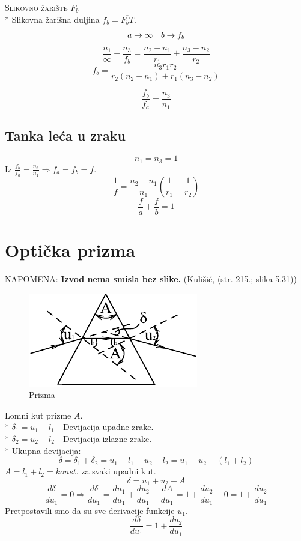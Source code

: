 \documentclass{report}
\begin{document}
\noindent \textsc{Slikovno žarište} $F_b$\\*
Slikovna žarišna duljina $f_b = \overline{F_b T}$.
$$\begin{array}{*{20}c}
   {a \to \infty } & {b \to f_b }  \\

\end{array} $$
$$\frac{n_1}{\infty} + \frac{n_3}{f_b} = \frac{n_2 - n_1}{r_1} + \frac{n_3 - n_2}{r_2}$$
$$f_b = \frac{n_3 r_1 r_2}{r_2 (n_2 - n_1) + r_1 (n_3 - n_2)}$$

$$\frac{f_b}{f_a} = \frac{n_3}{n_1}$$
\begin{center}
\end{center}

\subsection{Tanka leća u zraku}

$$n_1 = n_3 = 1$$
Iz $\frac{f_b}{f_a} = \frac{n_3}{n_1} \Rightarrow f_a = f_b = f$.
$$\frac{1}{f} = \frac{n_2 - n_1}{n_1} \left ( \frac{1}{r_1} - \frac{1}{r_2} \right )$$
$$\frac{f}{a} + \frac{f}{b} = 1$$
\begin{center}
\end{center}

\section{Optička prizma}
\textsc{NAPOMENA:} \textbf{Izvod nema smisla bez slike.} (Kulišić, (str. 215.; slika 5.31))
\begin{figure}[htb!]
	\centering%
	\includegraphics[scale=1.2]{prizma.pdf}
  \caption{Prizma}
  \label{prizma}
\end{figure}

Lomni kut prizme $A$.\\*
$\delta _1 = u_1 - l_1$ - Devijacija upadne zrake.\\*
$\delta _2 = u_2 - l_2$ - Devijacija izlazne zrake.\\*
Ukupna devijacija:
$$\delta = \delta _1 + \delta _2 = u_1 - l_1 + u_2 - l_2 = u_1 + u_2 - (l_1 + l_2)$$
$A = l_1 + l_2 = konst.$ za svaki upadni kut.
$$\delta = u_1 + u_2 - A$$
$$\frac{d\delta}{d u_1} = 0 \Rightarrow \frac{d \delta}{d u_1} = \frac{du_1}{du_1} + \frac{du_2}{du_1} - \frac{dA}{du_1} = 1+\frac{du_2}{du_1} - 0 = 1+\frac{du_2}{du_1}$$
Pretpostavili smo da su sve derivacije funkcije $u_1$.
$$\frac{d \delta}{du_1} = 1 + \frac{du_2}{du_1}$$
\end{document}
